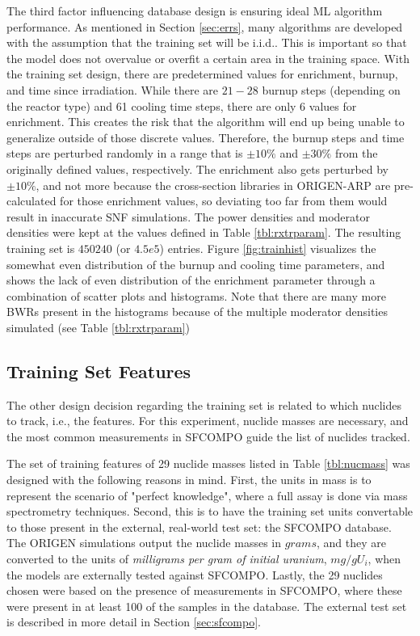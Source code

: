 The third factor influencing database design is ensuring ideal \gls{ML}
algorithm performance.  As mentioned in Section \ref{sec:errs}, many algorithms
are developed with the assumption that the training set will be
\acrfull{i.i.d.}.  This is important so that the model does not overvalue or
overfit a certain area in the training space. With the training set design,
there are predetermined values for enrichment, burnup, and time since
irradiation.  While there are $21-28$ burnup steps (depending on the reactor
type) and 61 cooling time steps, there are only 6 values for enrichment. This
creates the risk that the algorithm will end up being unable to generalize
outside of those discrete values. Therefore, the burnup steps and time steps
are perturbed randomly in a range that is $\pm10\%$ and $\pm30\%$ from the
originally defined values, respectively.  The enrichment also gets perturbed by
$\pm10\%$, and not more because the cross-section libraries in \gls{ORIGEN-ARP}
are pre-calculated for those enrichment values, so deviating too far from them
would result in inaccurate \gls{SNF} simulations. The power densities and
moderator densities were kept at the values defined in Table
\ref{tbl:rxtrparam}.  The resulting training set is $450240$ (or $4.5e5$)
entries.  Figure \ref{fig:trainhist} visualizes the somewhat even distribution
of the burnup and cooling time parameters, and shows the lack of even
distribution of the enrichment parameter through a combination of scatter plots
and histograms.  Note that there are many more \gls{BWR}s present in the
histograms because of the multiple moderator densities simulated (see Table
\ref{tbl:rxtrparam})

\subsection{Training Set Features}
\label{sec:snffeats}

The other design decision regarding the training set is related to
which nuclides to track, i.e., the features.  For this experiment, nuclide
masses are necessary, and the most common measurements in \gls{SFCOMPO} guide
the list of nuclides tracked.  

The set of training features of 29 nuclide masses listed in Table
\ref{tbl:nucmass} was designed with the following reasons in mind.  First, the
units in mass is to represent the scenario of "perfect knowledge", where a full
assay is done via mass spectrometry techniques.  Second, this is to have the
training set units convertable to those present in the external, real-world
test set: the \gls{SFCOMPO} database.  The \gls{ORIGEN} simulations output the
nuclide masses in $grams$, and they are converted to the units of
\textit{milligrams per gram of initial uranium}, $mg/gU_i$, when the models are
externally tested against \gls{SFCOMPO}. Lastly, the 29 nuclides chosen were
based on the presence of measurements in \gls{SFCOMPO}, where these were
present in at least 100 of the samples in the database.  The external test set
is described in more detail in Section \ref{sec:sfcompo}.

